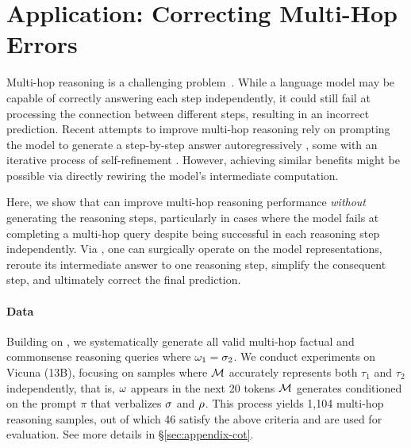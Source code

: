 \documentclass{article}
\theoremstyle{plain}
\theoremstyle{definition}
\theoremstyle{remark}
\begin{document}
\section{Application: Correcting Multi-Hop Errors}
\label{sec:multihop}
Multi-hop reasoning is a challenging problem~\cite{zhong2023mquake}. 
While a language model may be capable of correctly answering each step independently, it could still fail at processing the connection between different steps, resulting in an incorrect prediction. Recent attempts to improve multi-hop reasoning rely on prompting the model to generate a step-by-step answer autoregressively \citep[e.g.,][]{wei2022chain, yao2023tree, besta2023graph}, some with an iterative process of self-refinement \citep[e.g.,][]{madaan2023self}. 
However, achieving similar benefits might be possible via directly rewiring the model's intermediate computation.

Here, we show that \methodFamilyName{} can improve multi-hop reasoning performance \textit{without}  generating the reasoning steps, particularly in cases where the model fails at completing a multi-hop query despite being successful in each reasoning step independently. Via \methodFamilyName{}, one can surgically operate on the model representations, reroute its intermediate answer to one reasoning step, simplify the consequent step, and ultimately correct the final prediction.

\paragraph{Data} Building on \citet{hernandez2023linearity}, we systematically generate all valid multi-hop factual and commonsense reasoning queries where $\omega_1 = \sigma_2$. We conduct experiments on Vicuna (13B), focusing on samples where $\mathcal{M}$ accurately represents both $\tau_1$ and $\tau_2$ independently, that is, $\omega$ appears in the next 20 tokens $\mathcal{M}$ generates conditioned on the prompt $\pi$ that verbalizes $\sigma$ and $\rho$. This process yields 1,104 multi-hop reasoning samples, out of which 46 satisfy the above criteria and are used for evaluation. See more details in \S{\ref{sec:appendix-cot}}.
\end{document}
